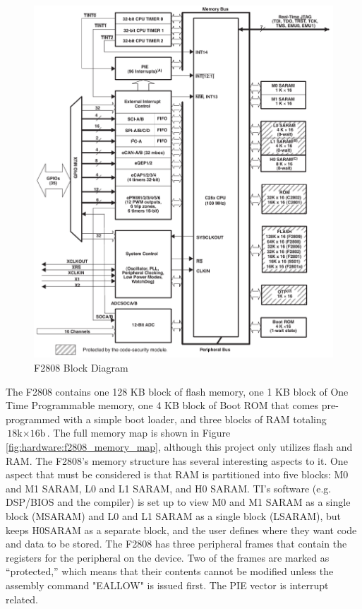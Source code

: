 \begin{figure}[ptb]
	\begin{centering}
		\includegraphics[scale=0.75]{Hardware/Figures/hardware-f2808_block_diagram.pdf}
		\caption[F2808 Block Diagram]{ F2808 Block Diagram \cite{ref:2006-ti-f2808_users_guide}}
		\label{fig:hardware:f2808_block_diagram}
	\end{centering}
\end{figure}

The F2808 contains one 128 KB block of flash memory, one 1 KB block of One Time Programmable memory, one 4 KB block of Boot ROM that comes pre-programmed with a simple boot loader, and three blocks of RAM totaling $\textrm{18k} \times \textrm{16b}$. The full memory map is shown in Figure \ref{fig:hardware:f2808_memory_map}, although this project only utilizes flash and RAM. The F2808's memory structure has several interesting aspects to it. One aspect that must be considered is that RAM is partitioned into five blocks: M0 and M1 SARAM, L0 and L1 SARAM, and H0 SARAM. TI's software (e.g. DSP/BIOS and the compiler) is set up to view M0 and M1 SARAM as a single block (MSARAM) and L0 and L1 SARAM as a single block (LSARAM), but keeps H0SARAM as a separate block, and the user defines where they want code and data to be stored. The F2808 has three peripheral frames that contain the registers for the peripheral on the device. Two of the frames are marked as ``protected,'' which means that their contents cannot be modified unless the assembly command "EALLOW" is issued first. The PIE vector is interrupt related. \cite{ref:2006-ti-f2808_users_guide}

